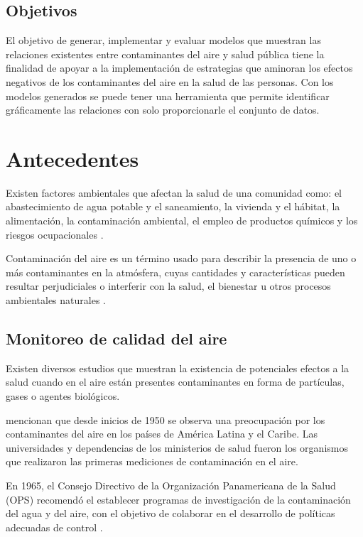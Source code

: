 \documentclass[3p,times]{elsarticle}
\begin{document}
\subsection{Objetivos}
El objetivo de generar, implementar y evaluar modelos que muestran las relaciones existentes entre contaminantes del aire y salud pública tiene la finalidad de apoyar a la implementación de estrategias que aminoran los efectos negativos de los contaminantes del aire en la salud de las personas. Con los modelos generados se puede tener una herramienta que permite identificar gráficamente las relaciones con solo proporcionarle el conjunto de datos.


\section{Antecedentes}

Existen factores ambientales que afectan la salud de una comunidad como: el abastecimiento de agua potable y el saneamiento, la vivienda y el hábitat, la alimentación, la contaminación ambiental, el empleo de productos químicos y los riesgos ocupacionales \citep{r2}. 

Contaminación del aire es un término usado para describir la presencia de uno o más contaminantes en la atmósfera, cuyas cantidades y características pueden resultar perjudiciales o interferir con la salud, el bienestar u otros procesos ambientales naturales \citep{r3}.

\subsection{Monitoreo de calidad del aire}
Existen diversos estudios que muestran la existencia de potenciales efectos a la salud cuando en el aire están presentes contaminantes en forma de partículas, gases o agentes biológicos.

\citet{r4} mencionan que desde inicios de 1950 se observa una preocupación por los contaminantes del aire  en los países de América Latina y el Caribe. Las universidades y dependencias de los ministerios de salud fueron los organismos que realizaron las primeras mediciones de contaminación en el aire.

En 1965, el Consejo Directivo de la Organización Panamericana de la Salud (OPS) recomendó el establecer programas de investigación de la contaminación del agua y del aire, con el objetivo de colaborar en el desarrollo de políticas adecuadas de control \citep{r5}.
\end{document}
